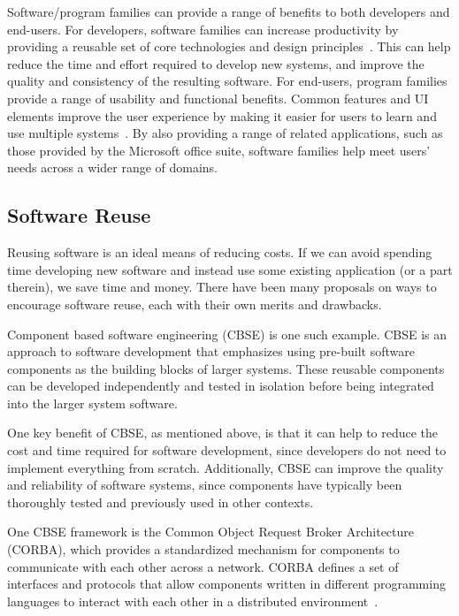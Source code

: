 Software/program families can provide a range of benefits to both developers 
and end-users. For developers, software families can increase 
productivity by providing a reusable set of core technologies and design 
principles~\cite{Pohl2005}. This can help reduce the time and effort required 
to develop new systems, and improve the quality and consistency of the 
resulting software. For end-users, program families provide a range of 
usability and functional benefits. Common features and UI elements improve the 
user experience by making it easier for users to learn and use multiple 
systems~\cite{Bosch2000}. By also providing a range of related 
applications, such as those provided by the Microsoft office suite, software 
families help meet users' needs across a wider range of domains.

\subsection{Software Reuse}

Reusing software is an ideal means of reducing costs. If we can avoid spending 
time developing new software and instead use some existing application (or a 
part therein), we save time and money. There have been many proposals on ways 
to encourage software reuse, each with their own merits and drawbacks.

Component based software engineering (CBSE) is one such example. CBSE is an 
approach to software development that emphasizes using pre-built software 
components as the building blocks of larger systems. These reusable components 
can be developed independently and tested in isolation before being integrated 
into the larger system software.

One key benefit of CBSE, as mentioned above, is that it can help to reduce the 
cost and time required for software development, since developers do not need 
to implement everything from scratch. Additionally, CBSE can improve the 
quality and reliability of software systems, since components have typically 
been thoroughly tested and previously used in other contexts.

One CBSE framework is the Common Object Request Broker Architecture (CORBA), 
which provides a standardized mechanism for components to 
communicate with each other across a network. CORBA defines a set of interfaces 
and protocols that allow components written in different programming languages 
to interact with each other in a distributed environment~\cite{OMG2000}.

